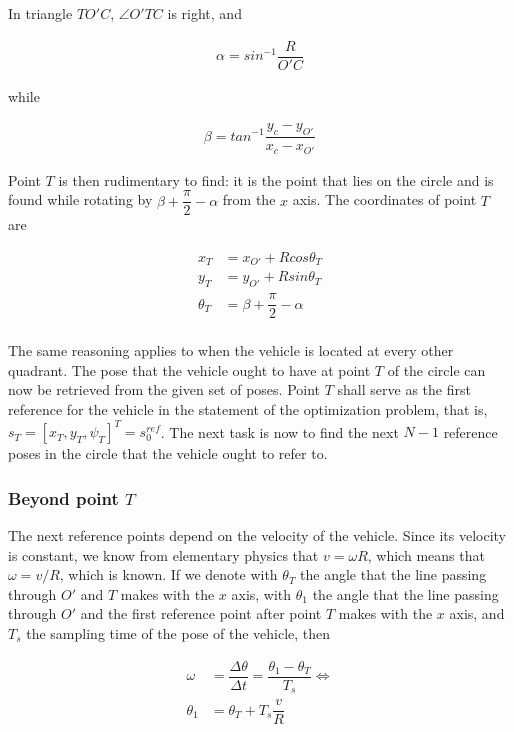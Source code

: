 In triangle $TO'C$, $\angle O'TC$ is right, and

\begin{align}
  \alpha = sin^{-1} \dfrac{R}{O'C}
\end{align}

while

\begin{align}
  \beta = tan^{-1} \dfrac{y_c - y_{O'}}{x_c - x_{O'}}
\end{align}

Point $T$ is then rudimentary to find: it is the point that lies on the
circle and is found while rotating by $\beta + \dfrac{\pi}{2} - \alpha$ from the
$x$ axis. The coordinates of point $T$ are

\begin{align}
  x_T &= x_{O'} + R cos\theta_T \\
  y_T &= y_{O'} + R sin\theta_T \\
  \theta_T &= \beta + \dfrac{\pi}{2} - \alpha \\
\end{align}

The same reasoning applies to when the vehicle is located at every other
quadrant. The pose that the vehicle ought to have at point $T$ of the circle
can now be retrieved from the given set of poses. Point $T$ shall serve as the
first reference for the vehicle in the statement of the optimization problem,
that is, $s_T = [x_T, y_T, \psi_T]^T = s_0^{ref}$. The next task is now to
find the next $N-1$ reference poses in the circle that the vehicle ought to
refer to.

\subsubsection{Beyond point $T$}

The next reference points depend on the velocity of the vehicle. Since its
velocity is constant, we know from elementary physics that $v = \omega R$,
which means that $\omega = v / R$, which is known. If we denote with $\theta_T$
the angle that the line passing through $O'$ and $T$ makes with the $x$ axis,
with $\theta_1$ the angle that the line passing through $O'$ and the first
reference point after point $T$ makes with the $x$ axis, and $T_s$ the sampling
time of the pose of the vehicle, then

\begin{align}
  \omega &= \dfrac{\Delta \theta}{\Delta t} = \dfrac{\theta_1 - \theta_T}{T_s} \Leftrightarrow \\
  \theta_1 &= \theta_T + T_s \dfrac{v}{R} \\
\end{align}

